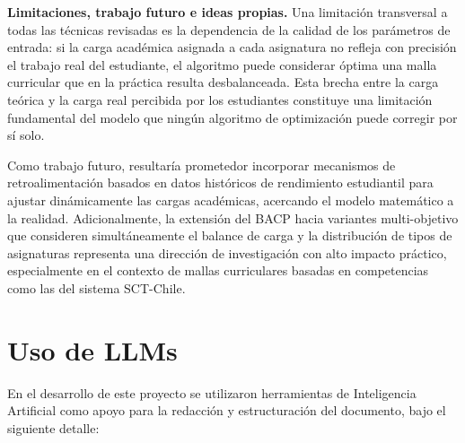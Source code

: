 \documentclass[letter, 10pt]{article}
\begin{document}
\textbf{Limitaciones, trabajo futuro e ideas propias.} Una limitaci\'on 
transversal a todas las t\'ecnicas revisadas es la dependencia de la 
calidad de los par\'ametros de entrada: si la carga acad\'emica 
asignada a cada asignatura no refleja con precisi\'on el trabajo real 
del estudiante, el algoritmo puede considerar \'optima una malla 
curricular que en la pr\'actica resulta desbalanceada. Esta brecha 
entre la carga te\'orica y la carga real percibida por los estudiantes 
constituye una limitaci\'on fundamental del modelo que ning\'un 
algoritmo de optimizaci\'on puede corregir por s\'i solo.

Como trabajo futuro, resultar\'ia prometedor incorporar mecanismos 
de retroalimentaci\'on basados en datos hist\'oricos de rendimiento 
estudiantil para ajustar din\'amicamente las cargas acad\'emicas, 
acercando el modelo matem\'atico a la realidad. Adicionalmente, la 
extensi\'on del BACP hacia variantes multi-objetivo que consideren 
simult\'aneamente el balance de carga y la distribuci\'on de tipos de 
asignaturas representa una direcci\'on de investigaci\'on con alto 
impacto pr\'actico, especialmente en el contexto de mallas 
curriculares basadas en competencias como las del sistema SCT-Chile.

\section{Uso de LLMs}
\noindent En el desarrollo de este proyecto se utilizaron herramientas de Inteligencia Artificial como apoyo para la redacci\'on y estructuraci\'on del documento, bajo el siguiente detalle:
\end{document}
